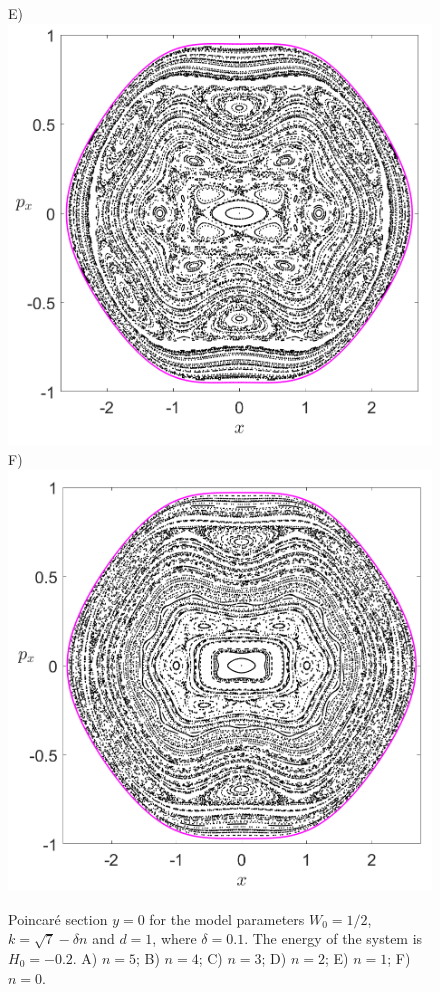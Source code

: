 \documentclass[10pt,aps,onecolumn,superscriptaddress]{revtex4-2}
\begin{document}
\begin{figure}[htbp]
	E)\includegraphics[scale=0.3]{PS_y_0_H_-0_2_w0_1div2_k_sqrt7_min_1delta_d_1.png}
	F)\includegraphics[scale=0.3]{PS_y_0_H_-0_2_w0_1div2_k_sqrt7_min_0delta_d_1.png}
	\caption{Poincar\'e section $y = 0$ for the model parameters $W_0 = 1/2$, $k = \sqrt{7} - \delta n$ and $d = 1$, where $\delta = 0.1$. The energy of the system is $H_0 = -0.2$. A) $n = 5$; B) $n = 4$; C) $n = 3$; D) $n = 2$; E) $n = 1$; F) $n = 0$.}
	\label{fig:psecBifProc_y_0}
\end{figure}
\end{document}
